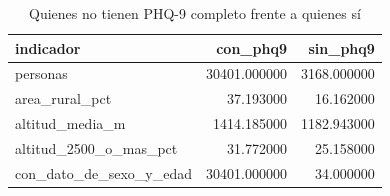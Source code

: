 \begin{table}[htbp]
\caption{Quienes no tienen PHQ-9 completo frente a quienes sí}
\label{tab:tabla_66_perfil_sin_phq9}
\begin{tabular}{lrr}
\toprule
indicador & con\_phq9 & sin\_phq9 \\
\midrule
personas & 30401.000000 & 3168.000000 \\
area\_rural\_pct & 37.193000 & 16.162000 \\
altitud\_media\_m & 1414.185000 & 1182.943000 \\
altitud\_2500\_o\_mas\_pct & 31.772000 & 25.158000 \\
con\_dato\_de\_sexo\_y\_edad & 30401.000000 & 34.000000 \\
\bottomrule
\end{tabular}
\end{table}
